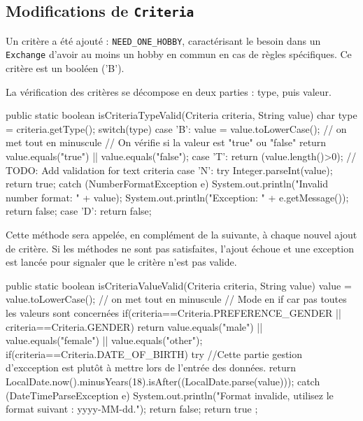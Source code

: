 \documentclass{mytex}
\begin{document}
\subsection{Modifications de \texttt{Criteria}}

Un critère a été ajouté : \texttt{NEED\_ONE\_HOBBY}, caractérisant le besoin dans un \texttt{Exchange} d'avoir au moins un hobby en commun en cas de règles spécifiques. Ce critère est un booléen ('B').

La vérification des critères se décompose en deux parties : type, puis valeur.


\begin{codebox}
public static boolean isCriteriaTypeValid(Criteria criteria, String value) {
	char type = criteria.getType();
	switch(type) {
		case 'B':
		value = value.toLowerCase(); // on met tout en minuscule
		// On vérifie si la valeur est "true" ou "false"
		return value.equals("true") || value.equals("false");
		case 'T':
		return (value.length()>0); // TODO: Add validation for text criteria
		case 'N':
		try {
			Integer.parseInt(value);
			return true;
		} catch (NumberFormatException e) {
			System.out.println("Invalid number format: " + value);
			System.out.println("Exception: " + e.getMessage());
			return false;
		}
		case 'D':
	}
	return false;
}
\end{codebox}

Cette méthode sera appelée, en complément de la suivante, à chaque nouvel ajout de critère. Si les méthodes ne sont pas satisfaites, l'ajout échoue et une exception est lancée pour signaler que le critère n'est pas valide.


\begin{codebox}
public static boolean isCriteriaValueValid(Criteria criteria, String value) {
	value = value.toLowerCase(); // on met tout en minuscule
	// Mode en if car pas toutes les valeurs sont concernées
	if(criteria==Criteria.PREFERENCE_GENDER || criteria==Criteria.GENDER) return value.equals("male") || value.equals("female") || value.equals("other");
	if(criteria==Criteria.DATE_OF_BIRTH) {
		try {   //Cette partie gestion d'excception est plutôt à mettre lors de l'entrée des données.
			return LocalDate.now().minusYears(18).isAfter((LocalDate.parse(value)));
		} catch (DateTimeParseException e) {
			System.out.println("Format invalide, utilisez le format suivant : yyyy-MM-dd."); 
			return false;
		}
	}   
	return true ;
}
\end{codebox}
\end{document}
